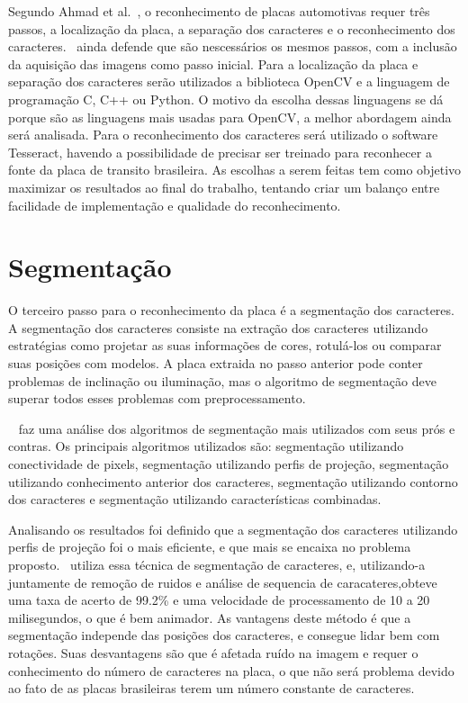 Segundo Ahmad et al.~\cite{ahmad2015automatic}, o reconhecimento de placas
automotivas requer três passos, a localização da placa, a separação dos
caracteres e o reconhecimento dos caracteres.~\cite{s2013automatic} ainda defende 
que são nescessários os mesmos passos, com a inclusão da aquisição das imagens como passo inicial. 
Para a localização da placa e
separação dos caracteres serão utilizados a biblioteca OpenCV e a linguagem de
programação C, C++ ou Python. O motivo da escolha dessas linguagens se dá porque
são as linguagens mais usadas para OpenCV, a melhor abordagem ainda será
analisada. Para o reconhecimento dos caracteres será utilizado o software Tesseract, havendo a 
possibilidade de precisar ser treinado para reconhecer a fonte da placa de transito brasileira. As escolhas a serem
feitas tem como objetivo maximizar os resultados ao final do trabalho, tentando
criar um balanço entre facilidade de implementação e qualidade do
reconhecimento.

\section{Segmentação}
\label{sec:segmentacao}

O terceiro passo para o reconhecimento da placa é a segmentação dos caracteres. A segmentação dos caracteres 
consiste na extração dos caracteres utilizando estratégias como projetar as suas informações de cores, rotulá-los 
ou comparar suas posições com modelos. A placa extraida no passo anterior pode conter problemas de inclinação ou 
iluminação, mas o algoritmo de segmentação deve superar todos esses problemas com preprocessamento. ~\cite{s2013automatic}

~\cite{s2013automatic} faz uma análise dos algoritmos de segmentação mais utilizados com seus prós e contras. 
Os principais algoritmos utilizados são: segmentação utilizando conectividade de pixels, segmentação utilizando perfis 
de projeção, segmentação utilizando conhecimento anterior dos caracteres, segmentação utilizando contorno dos caracteres 
e segmentação utilizando características combinadas.

Analisando os resultados foi definido que a segmentação dos caracteres utilizando perfis de projeção foi o mais eficiente,
e que mais se encaixa no problema proposto.~\cite{sanyuan2004car} utiliza essa técnica de segmentação de caracteres, e, 
utilizando-a juntamente de remoção de ruidos e análise de sequencia de caracateres,obteve uma taxa de acerto de 99.2\% e 
uma velocidade de processamento de 10 a 20 milisegundos, o que é bem animador. As vantagens deste método é que a segmentação 
independe das posições dos caracteres, e consegue lidar bem com rotações. Suas desvantagens são que é afetada ruído na imagem 
e requer o conhecimento do número de caracteres na placa, o que não será problema devido ao fato de as placas brasileiras terem 
um número constante de caracteres.

